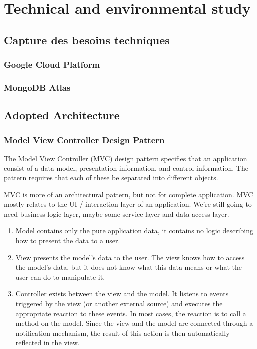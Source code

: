 

\chapter{Technical and environmental study}%
\label{chap:chapter_tree}

\section{Capture des besoins techniques}
\subsection{Google Cloud Platform}
\subsection{MongoDB Atlas}
\section{Adopted Architecture}

\subsection{Model View Controller Design Pattern}

The Model View Controller (MVC) design pattern specifies that an application consist of a data model, presentation information, and control information. The pattern requires that each of these be separated into different objects.

MVC is more of an architectural pattern, but not for complete application. MVC mostly relates to the UI / interaction layer of an application. We’re still going to need business logic layer, maybe some service layer and data access layer.
\begin{enumerate}
      \item Model contains only the pure application data, it contains no logic describing how to present the data to a user.
      \item View presents the model’s data to the user. The view knows how to access the model’s data, but it does not know what this data means or what the user can do to manipulate it.
      \item Controller exists between the view and the model. It listens to events triggered by the view (or another external source) and executes the appropriate reaction to these events. In most cases, the reaction is to call a method on the model. Since the view and the model are connected through a notification mechanism, the result of this action is then automatically reflected in the view.
\end{enumerate}

